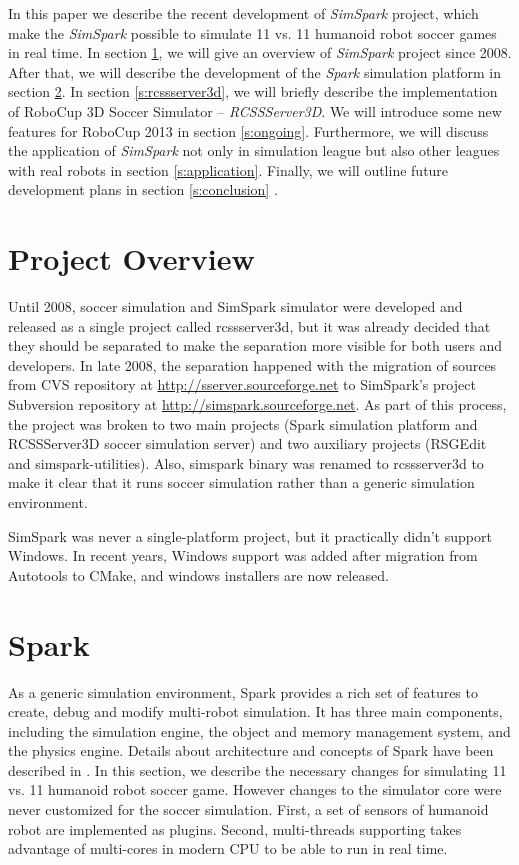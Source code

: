 \documentclass{llncs}
\begin{document}
In this paper we describe the recent development of \textit{SimSpark} project, which make the \textit{SimSpark} possible to simulate 11 vs. 11 humanoid robot soccer games in real time.
In section \ref{s:overview}, we will give an overview of \textit{SimSpark} project since 2008. After that, we will describe the development of the \textit{Spark} simulation platform in section \ref{s:spark}.
In section \ref{s:rcssserver3d}, we will briefly describe the implementation of RoboCup 3D Soccer Simulator -- \textit{RCSSServer3D}.
We will introduce some new features for RoboCup 2013 in section \ref{s:ongoing}.
Furthermore, we will discuss the application of \textit{SimSpark} not only in simulation league but also other leagues with real robots in section \ref{s:application}.
Finally, we will outline future development plans in section \ref{s:conclusion} .



\section{Project Overview}
\label{s:overview}

Until 2008, soccer simulation and SimSpark simulator were developed and released as a single project called rcssserver3d, but it was already decided that they should be separated 
to make the separation more visible for both users and developers.
In late 2008, the separation happened with the migration of sources from CVS repository
at \url{http://sserver.sourceforge.net} to SimSpark's project Subversion repository at 
\url{http://simspark.sourceforge.net}. As part of this process, the project was broken
to two main projects (Spark simulation platform and RCSSServer3D soccer simulation server) 
and two auxiliary projects (RSGEdit and simspark-utilities). Also, simspark binary was 
renamed to rcssserver3d to make it clear that it runs soccer simulation rather than a 
generic simulation environment.

SimSpark was never a single-platform project, but it practically didn't support 
Windows. In recent years, Windows support was added after migration from Autotools
to CMake, and windows installers are now released. 

\section{Spark}
\label{s:spark}
As a generic simulation environment, Spark provides a rich set of features to create, debug and modify multi-robot simulation.
It has three main components, including the simulation engine, the object and memory management system, and the physics engine. Details about architecture and concepts of Spark have been described in \cite{Boedecker2008,OR05}.
In this section, we describe the necessary changes for simulating 11 vs. 11 humanoid robot soccer game.
However changes to the simulator core were never customized for the soccer simulation.
First, a set of sensors of humanoid robot are implemented as plugins. Second, multi-threads supporting takes advantage of multi-cores in modern CPU to be able to run in real time.
\end{document}
